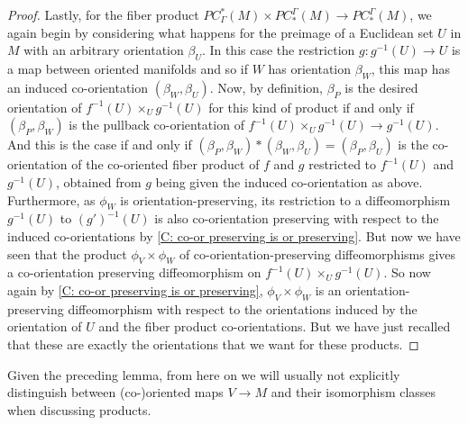 \begin{proof}
	Lastly, for the fiber product $PC^*_\Gamma(M) \times PC_*^\Gamma(M) \to PC_*^\Gamma(M)$, we again begin by considering what happens for the preimage of a Euclidean set $U$ in $M$ with an arbitrary orientation $\beta_U$.
	In this case the restriction $g \colon g^{-1}(U) \to U$ is a map between oriented manifolds and so if $W$ has orientation $\beta_W$, this map has an induced co-orientation $(\beta_W, \beta_U)$.
	Now, by definition, $\beta_P$ is the desired orientation of $f^{-1}(U) \times_U g^{-1}(U)$ for this kind of product if and only if $(\beta_P,\beta_W)$ is the pullback co-orientation of $f^{-1}(U) \times_U g^{-1}(U) \to g^{-1}(U)$.
	And this is the case if and only if $(\beta_P,\beta_W)*(\beta_W,\beta_U) = (\beta_P, \beta_U)$ is the co-orientation of the co-oriented fiber product of $f$ and $g$ restricted to $f^{-1}(U)$ and $g^{-1}(U)$, obtained from $g$ being given the induced co-orientation as above.
	Furthermore, as $\phi_W$ is orientation-preserving, its restriction to a diffeomorphism $g^{-1}(U)$ to $(g')^{-1}(U)$ is also co-orientation preserving with respect to the induced co-orientations by \cref{C: co-or preserving is or preserving}.
	But now we have seen that the product $\phi_V \times \phi_W$ of co-orientation-preserving diffeomorphisms gives a co-orientation preserving diffeomorphism on $f^{-1}(U) \times_U g^{-1}(U)$.
	So now again by \cref{C: co-or preserving is or preserving}, $\phi_V \times \phi_W$ is an orientation-preserving diffeomorphism with respect to the orientations induced by the orientation of $U$ and the fiber product co-orientations.
	But we have just recalled that these are exactly the orientations that we want for these products.
\end{proof}

Given the preceding lemma, from here on we will usually not explicitly distinguish between (co\nobreakdash-)oriented maps $V \to M$ and their isomorphism classes when discussing products.






